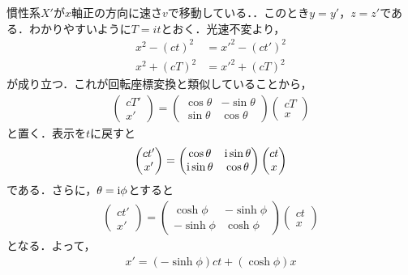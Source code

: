 \documentclass{report}
\begin{document}
  慣性系$X'$が$x$軸正の方向に速さ$v$で移動している．．このとき$y=y'，z=z'$である．わかりやすいように$T=it$とおく．光速不変より，
  \begin{align}
    x^2 - (ct)^2 &= x'^2 - (ct')^2\\
    x^2 + (cT)^2 &= x'^2 + (cT)^2
  \end{align}
  が成り立つ．これが回転座標変換と類似していることから，
  \begin{align}
    \begin{pmatrix}
      cT' \\ x'
    \end{pmatrix}
    =
    \begin{pmatrix}
      \cos\theta & -\sin\theta\\
      \sin\theta & \cos\theta
    \end{pmatrix}
    \begin{pmatrix}
      cT\\x
    \end{pmatrix}
  \end{align}
  と置く．表示を$t$に戻すと
  \begin{align}
    \begin{pmatrix}
      ct' \\ x'
    \end{pmatrix}
    =
    \begin{pmatrix}
      \cos\theta & \mathrm{i}\sin\theta\\
      \mathrm{i}\sin\theta & \cos\theta
    \end{pmatrix}
    \begin{pmatrix}
      ct\\x
    \end{pmatrix}
  \end{align}
  である．さらに，$\theta = \mathrm{i}\phi$とすると
  \begin{align}
    \begin{pmatrix}
      ct' \\ x'
    \end{pmatrix}
    =
    \begin{pmatrix}
      \cosh\phi & -\sinh\phi\\
      -\sinh\phi & \cosh\phi
    \end{pmatrix}
    \begin{pmatrix}
      ct\\x
    \end{pmatrix}
  \end{align}
  となる．よって，
  \begin{align}
    x' = (-\sinh\phi)ct + (\cosh\phi)x
  \end{align}
\end{document}
